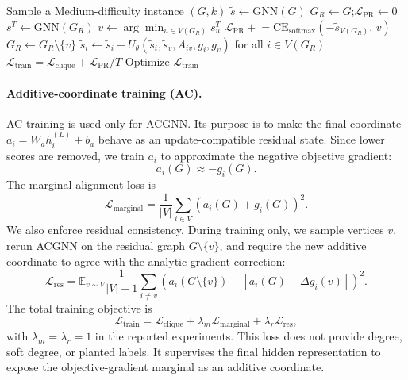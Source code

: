 \documentclass[11pt]{article}
\theoremstyle{plain}
\theoremstyle{definition}
\theoremstyle{remark}
\begin{document}
\begin{algorithm}[t]
  \caption{PR Training Step}
  \label{alg:training}
  \begin{algorithmic}[1]
    \State Sample a Medium-difficulty instance $(G, k)$
    \State $\tilde{s} \leftarrow \mathrm{GNN}(G)$ 
    \State $G_R \leftarrow G$;\quad $\mathcal{L}_{\mathrm{PR}} \leftarrow 0$
    \State $s^T \leftarrow \mathrm{GNN}(G_R)$ 
    \State $v \leftarrow \arg\min_{u \in V(G_R)} s^T_u$ 
    \State $\mathcal{L}_{\mathrm{PR}} \mathrel{+}=
    \mathrm{CE}_{\mathrm{softmax}}(-\tilde{s}_{V(G_R)},\, v)$
    \State $G_R \leftarrow G_R \setminus \{v\}$
    \State $\tilde{s}_i \leftarrow \tilde{s}_i +
    U_\theta(\tilde{s}_i, \tilde{s}_v, A_{iv}, g_i, g_v)$
    \quad for all $i \in V(G_R)$ 
    \EndFor
    \State $\mathcal{L}_{\mathrm{train}} =
    \mathcal{L}_{\mathrm{clique}} + \mathcal{L}_{\mathrm{PR}} / T$
    \State Optimize $\mathcal{L}_{\mathrm{train}}$
  \end{algorithmic}
\end{algorithm}

\paragraph{Additive-coordinate training (AC).}
AC training is used only for ACGNN. Its purpose is to make the final coordinate
$a_i=W_a h_i^{(L)}+b_a$ behave as an update-compatible residual state. Since lower
scores are removed, we train $a_i$ to approximate the negative objective gradient:
\[
  a_i(G) \approx -g_i(G).
\]
The marginal alignment loss is
\[
  \mathcal{L}_{\mathrm{marginal}}
  =
  \frac{1}{|V|}
  \sum_{i\in V}
  \left(a_i(G)+g_i(G)\right)^2 .
\]
We also enforce residual consistency. During training only, we sample vertices $v$,
rerun ACGNN on the residual graph $G\setminus\{v\}$, and require the new additive
coordinate to agree with the analytic gradient correction:
\[
  \mathcal{L}_{\mathrm{res}}
  =
  \mathbb{E}_{v\sim V}
  \frac{1}{|V|-1}
  \sum_{i\neq v}
  \left(
    a_i(G\setminus\{v\})
    -
    \left[
      a_i(G)-\Delta g_i(v)
    \right]
  \right)^2 .
\]
The total training objective is
\[
  \mathcal{L}_{\mathrm{train}}
  =
  \mathcal{L}_{\mathrm{clique}}
  +
  \lambda_m\mathcal{L}_{\mathrm{marginal}}
  +
  \lambda_r\mathcal{L}_{\mathrm{res}} ,
\]
with $\lambda_m=\lambda_r=1$ in the reported experiments. This loss does not provide
degree, soft degree, or planted labels. It supervises the final hidden representation
to expose the objective-gradient marginal as an additive coordinate.
\end{document}
